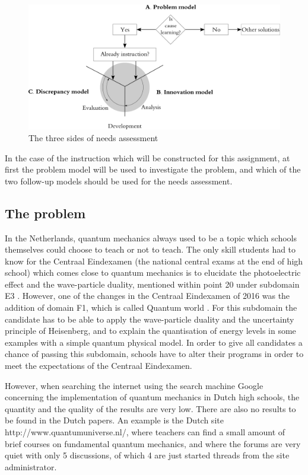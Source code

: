 \documentclass[11pt,twoside]{report} %
\begin{document}
\begin{figure}[h]
\centering
\includegraphics[width=\textwidth]{needsassessment}
\caption{The three sides of needs assessment \protect\cite{smithragan}\label{fig:needsassessment}}
\end{figure}

In the case of the instruction which will be constructed for this assignment, at first the problem model will be used to investigate the problem, and which of the two follow-up models should be used for the needs assessment.

\subsection{The problem}
\label{subsec:problem}

In the Netherlands, quantum mechanics always used to be a topic which schools themselves could choose to teach or not to teach. The only skill students had to know for the Centraal Eindexamen (the national central exams at the end of high school) which comes close to quantum mechanics is to elucidate the photoelectric effect and the wave-particle duality, mentioned within point 20 under subdomain E3 \cite{eindexamen2015}. However, one of the changes in the Centraal Eindexamen of 2016 was the addition of domain F1, which is called Quantum world \cite{eindexamen2016}. For this subdomain the candidate has to be able to apply the wave-particle duality and the uncertainty principle of Heisenberg, and to explain the quantisation of energy levels in some examples with a simple quantum physical model. In order to give all candidates a chance of passing this subdomain, schools have to alter their programs in order to meet the expectations of the Centraal Eindexamen.

However, when searching the internet using the search machine Google concerning the implementation of quantum mechanics in Dutch high schools, the quantity and the quality of the results are very low. There are also no results to be found in the Dutch papers. An example is the Dutch site http://www.quantumuniverse.nl/, where teachers can find a small amount of brief courses on fundamental quantum mechanics, and where the forums are very quiet with only 5 discussions, of which 4 are just started threads from the site administrator.
\end{document}
